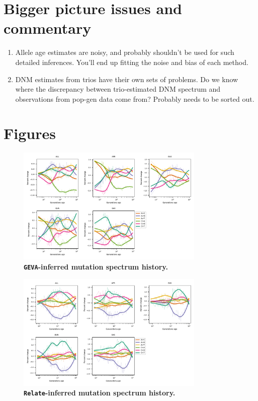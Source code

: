 \documentclass[]{article}
\begin{document}
\section{Bigger picture issues and commentary}

\begin{enumerate}
    \item Allele age estimates are noisy, and probably shouldn't be used
        for such detailed inferences. You'll end up fitting the noise and
        bias of each method.
    \item DNM estimates from trios have their own sets of problems. Do we
        know where the discrepancy between trio-estimated DNM spectrum and
        observations from pop-gen data come from? Probably needs to be
        sorted out.
\end{enumerate}

\break

\section{Figures}

\begin{figure}[ht!]
    \centering
    \includegraphics[width=0.8\textwidth]{../plots/spectrum_history.geva.max_age.10000.pdf}
    \caption{
        \textbf{\texttt{GEVA}-inferred mutation spectrum history.}
    }
    \label{fig:geva-spectra}
\end{figure}


\begin{figure}[ht!]
    \centering
    \includegraphics[width=0.8\textwidth]{../plots/spectrum_history.relate.max_age.10000.pdf}
    \caption{
        \textbf{\texttt{Relate}-inferred mutation spectrum history.}
    }
    \label{fig:relate-spectra}
\end{figure}
\end{document}
